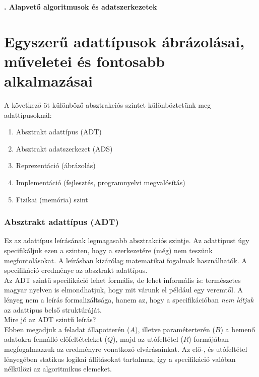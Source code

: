 \documentclass[12pt,margin=0px]{article}
\date{}
\begin{document}
    \thispagestyle{fancy}

    \begin{center}
        {\huge\bfseries{}. Alapvető algoritmusok és adatszerkezetek} \\
    \end{center}
    	
	\section*{Egyszerű adattípusok ábrázolásai, műveletei és fontosabb alkalmazásai}
	
    A következő öt különböző absztrakciós szintet különböztetünk meg adattípusoknál:
    \begin{enumerate}
      \item Absztrakt adattípus (ADT)
      \item Absztrakt adatszerkezet (ADS)
      \item Reprezentáció (ábrázolás)
      \item Implementáció (fejlesztés, programnyelvi megvalósítás)
      \item Fizikai (memória) szint
    \end{enumerate}

    \subsubsection*{Absztrakt adattípus (ADT)}

    \noindent Ez az adattípus leírásának legmagasabb absztrakciós szintje. Az adattípust úgy specifikáljuk ezen a szinten, hogy a szerkezetére (még) nem teszünk megfontolásokat. A leírásban kizárólag matematikai fogalmak használhatók. A specifikáció eredménye az absztrakt adattípus.\\

    \noindent Az ADT szintű specifikáció lehet formális, de lehet informális is: természetes magyar nyelven is elmondhatjuk, hogy mit várunk el például egy veremtől. A lényeg nem a leírás formalizáltsága, hanem az, hogy a specifikációban \emph{nem látjuk} az adattípus belső struktúráját.\\

    \noindent Mire jó az ADT szintű leírás?\\

    \noindent Ebben megadjuk a feladat állapotterén ($A$), illetve paraméterterén ($B$) a bemenő adatokra fennálló előfeltételeket ($Q$), majd az utófeltétel ($R$) formájában megfogalmazzuk az eredményre vonatkozó elvárásainkat. Az elő-, és utófeltétel lényegében statikus logikai állításokat tartalmaz, így a specifikáció valóban nélkülözi az algoritmikus elemeket.\\
\end{document}
